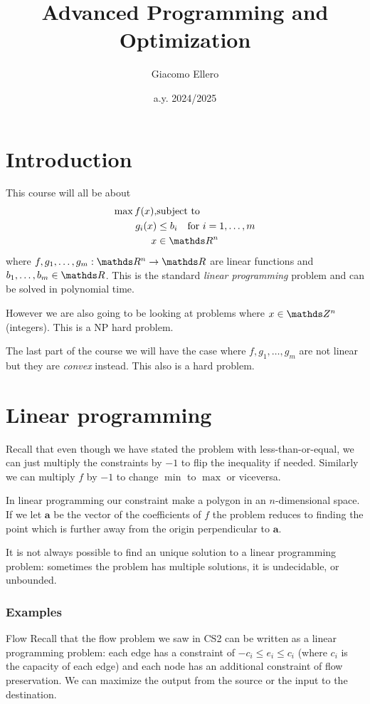 \documentclass[12pt]{extarticle}
\title{Advanced Programming and Optimization}
\author{Giacomo Ellero}
\date{a.y. 2024/2025}
\renewcommand{\vec}[1]{\bm{#1}}
\begin{document}
\firstpage

\section{Introduction}

This course will all be about
\begin{align}
	\max f(x), & \text{subject to}                          \\
	g_i(x)     & \leq b_i \quad \text{for } i = 1, \dots, m \\
	x          & \in \R^n
\end{align}
where $f, g_1, \dots, g_m: \R^n \to \R$ are linear functions and $b_1, \dots, b_m \in \R$.
This is the standard \emph{linear programming} problem and can be solved in polynomial time.

However we are also going to be looking at problems where $x \in \Z^n$ (integers).
This is a NP hard problem.

The last part of the course we will have the case where $f, g_1, \dots, g_m$ are not linear
but they are \emph{convex} instead. This also is a hard problem.

\section{Linear programming}

Recall that even though we have stated the problem with less-than-or-equal, we can just multiply
the constraints by $-1$ to flip the inequality if needed.
Similarly we can multiply $f$ by $-1$ to change $\min$ to $\max$ or viceversa.

In linear programming our constraint make a polygon in an $n$-dimensional space.
If we let $\vec a$ be the vector of the coefficients of $f$ the problem reduces to finding the
point which is further away from the origin perpendicular to $\vec a$.

It is not always possible to find an unique solution to a linear programming problem: sometimes
the problem has multiple solutions, it is undecidable, or unbounded.

\subsubsection{Examples}

\begin{example}{Flow}{}
	Recall that the flow problem we saw in CS2 can be written as a linear programming problem:
	each edge has a constraint of $-c_i \leq e_i \leq c_i$ (where $c_i$ is the capacity of each edge)
	and each node has an additional constraint of flow preservation.
	We can maximize the output from the source or the input to the destination.
\end{example}
\end{document}
